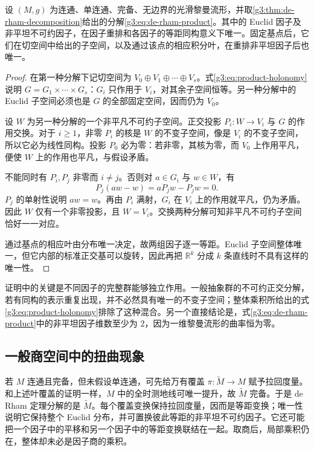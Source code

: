\begin{proposition}\label{g3:prop:de-rham-uniqueness}
	设 \((M,g)\) 为连通、单连通、完备、无边界的光滑黎曼流形，并取\cref{g3:thm:de-rham-decomposition}给出的分解\eqref{g3:eq:de-rham-product}。其中的 Euclid 因子及非平坦不可约因子，在因子重排和各因子的等距同构意义下唯一。固定基点后，它们在切空间中给出的子空间，以及通过该点的相应积分叶，在重排非平坦因子后也唯一。
\end{proposition}
\begin{proof}
	在第一种分解下记切空间为 \(V_0\oplus V_1\oplus\cdots\oplus V_s\)。式\eqref{g3:eq:product-holonomy}说明
	\(G=G_1\times\cdots\times G_s\)：\(G_i\) 只作用于 \(V_i\)，对其余子空间恒等。另一种分解中的 Euclid 子空间必须也是 \(G\) 的全部固定空间，因而仍为 \(V_0\)。

	设 \(W\) 为另一种分解的一个非平凡不可约子空间。正交投影
	\(P_i:W\to V_i\) 与 \(G\) 的作用交换。对于 \(i\ge1\)，非零 \(P_i\) 的核是 \(W\) 的不变子空间，像是 \(V_i\) 的不变子空间，所以它必为线性同构。投影 \(P_0\) 必为零：若非零，其核为零，而 \(V_0\) 上作用平凡，便使 \(W\) 上的作用也平凡，与假设矛盾。

	不能同时有 \(P_i,P_j\) 非零而 \(i\ne j\)。否则对 \(a\in G_i\) 与 \(w\in W\)，有
	\[
		P_j(aw-w)=aP_jw-P_jw=0.
	\]
	\(P_j\) 的单射性说明 \(aw=w\)。再由 \(P_i\) 满射，\(G_i\) 在 \(V_i\) 上的作用就平凡，仍为矛盾。因此 \(W\) 仅有一个非零投影，且 \(W=V_i\)。交换两种分解可知非平凡不可约子空间恰好一一对应。

	通过基点的相应叶由分布唯一决定，故两组因子逐一等距。Euclid 子空间整体唯一，但它内部的标准正交基可以旋转，因此再把 \(\mathbb R^k\) 分成 \(k\) 条直线时不具有这样的唯一性。
\end{proof}

证明中的关键是不同因子的完整群能够独立作用。一般抽象群的不可约正交分解，若有同构的表示重复出现，并不必然具有唯一的不变子空间；整体乘积所给出的式\eqref{g3:eq:product-holonomy}排除了这种混合。另一个直接结论是，式\eqref{g3:eq:de-rham-product}中的非平坦因子维数至少为 \(2\)，因为一维黎曼流形的曲率恒为零。

\subsection{一般商空间中的扭曲现象}
\label{g3:subsec:0503:04}

若 \(M\) 连通且完备，但未假设单连通，可先给万有覆盖
\(\pi:\widetilde M\to M\) 赋予拉回度量。和上述叶覆盖的证明一样，\(M\) 中的全时测地线可唯一提升，故 \(\widetilde M\) 完备。于是 de Rham 定理分解的是 \(\widetilde M\)。每个覆盖变换保持拉回度量，因而是等距变换；唯一性说明它保持整个 Euclid 分布，并可置换彼此等距的非平坦不可约因子。它还可能把一个因子中的平移和另一个因子中的等距变换联结在一起。取商后，局部乘积仍在，整体却未必是因子商的乘积。

